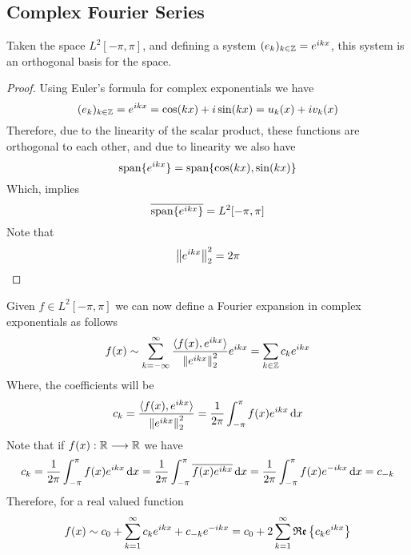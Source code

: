 \documentclass[../complete.tex]{subfiles}
\begin{document}
\subsection{Complex Fourier Series}
\begin{thm}
	Taken the space $L^2[-\pi,\pi]$, and defining a system $(e_k)_{k\in\Z}=e^{ikx}$, this system is an orthogonal basis for the space.
\end{thm}
\begin{proof}
	Using Euler's formula for complex exponentials we have
	\begin{equation*}
		(e_k)_{k\in\Z}=e^{ikx}=\cos(kx)+i\sin(kx)=u_k(x)+iv_k(x)
	\end{equation*}
	Therefore, due to the linearity of the scalar product, these functions are orthogonal to each other, and due to linearity we also have
	\begin{equation*}
		\span\{e^{ikx}\}=\span\{\cos(kx),\sin(kx)\}
	\end{equation*}
	Which, implies
	\begin{equation*}
		\cc{\span\{e^{ikx}\}}=L^2[-\pi,\pi]
	\end{equation*}
	Note that
	\begin{equation*}
		\pnorm[2]{e^{ikx}}^2=2\pi
	\end{equation*}
\end{proof}
\begin{dfn}
	Given $f\in L^2[-\pi,\pi]$ we can now define a Fourier expansion in complex exponentials as follows
	\begin{equation}
		f(x)\sim\sum_{k=-\infty}^{\infty}\frac{\spr{f(x)}{e^{ikx}}}{\pnorm[2]{e^{ikx}}^2}e^{ikx}=\sum_{k\in\Z}^{}c_ke^{ikx}
		\label{eq:complexfouser}
	\end{equation}
	Where, the coefficients will be
	\begin{equation}
		c_k=\frac{\spr{f(x)}{e^{ikx}}}{\pnorm[2]{e^{ikx}}^2}=\frac{1}{2\pi}\int_{-\pi}^{\pi}f(x)e^{ikx}\diff x
		\label{eq:complexfousercoef}
	\end{equation}
	Note that if $f(x):\R\fto\R$ we have
	\begin{equation*}
		c_k=\frac{1}{2\pi}\int_{-\pi}^{\pi}f(x)e^{ikx}\diff x=\frac{1}{2\pi}\int_{-\pi}^{\pi}\cc{f(x)e^{ikx}}\diff x=\frac{1}{2\pi}\int_{-\pi}^{\pi}f(x)e^{-ikx}\diff x=c_{-k}
	\end{equation*}
	Therefore, for a real valued function
	\begin{equation}
		f(x)\sim c_0+\sum_{k=1}^{\infty}c_ke^{ikx}+c_{-k}e^{-ikx}=c_0+2\sum_{k=1}^{\infty}\real\left\{ c_ke^{ikx} \right\}
		\label{eq:rvfcompfouser}
	\end{equation}
\end{dfn}
\end{document}
